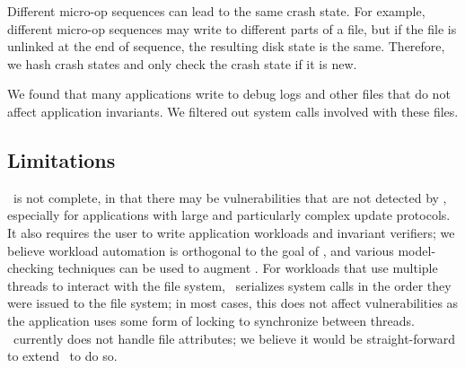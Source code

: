 Different micro-op sequences can lead to the same crash
state. For example, different micro-op sequences may write to different parts
of a file, but if the file is unlinked at the end of sequence, the resulting
disk state is the same. Therefore, we hash crash states and only
check the crash state if it is new.

We found that many applications write to debug logs and other files
that do not affect application invariants. We filtered out system calls
involved with these files. 

\subsection{Limitations}
\label{sec-discuss}

\toolname\ is not complete, in that there may be vulnerabilities that are not
detected by \toolname, especially for applications with large and particularly
complex update protocols. It also requires the user to write application
workloads and invariant verifiers; we believe workload automation is
orthogonal to the goal of \toolname, and various model-checking techniques can
be used to augment \toolname. For workloads that use multiple threads to
interact with the file system, \toolname\ serializes system calls in the order
they were issued to the file system; in most cases, this does not affect
vulnerabilities as the application uses some form of locking to
synchronize between threads. \toolname\ currently does not handle file
attributes; we believe it would be straight-forward to extend \toolname\ to do
so.



